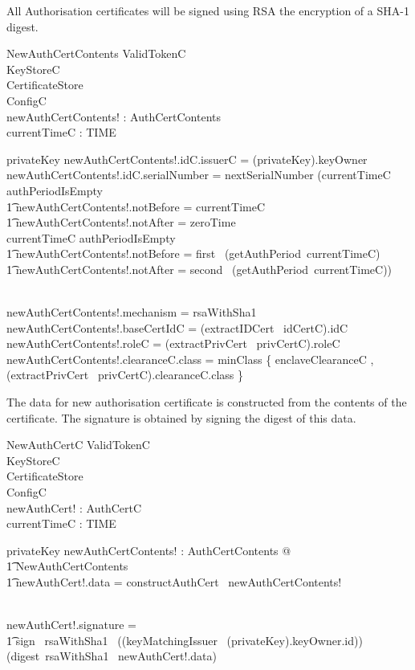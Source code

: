 All Authorisation certificates will be signed using RSA the encryption
of a SHA-1 digest.

\begin{schema}{NewAuthCertContents}
        ValidTokenC
\\      KeyStoreC
\\      CertificateStore
\\      ConfigC
\\      newAuthCertContents! : AuthCertContents
\\      currentTimeC : TIME
\where
        
        privateKey \neq \Nil
\also
        newAuthCertContents!.idC.issuerC = (\The privateKey).keyOwner
\\      newAuthCertContents!.idC.serialNumber = nextSerialNumber
\also
        (currentTimeC \in authPeriodIsEmpty
\\ \t1    \land newAuthCertContents!.notBefore = currentTimeC
\\ \t1    \land  newAuthCertContents!.notAfter = zeroTime 
\\   \lor
        currentTimeC \notin authPeriodIsEmpty
\\ \t1    \land newAuthCertContents!.notBefore = first~ (getAuthPeriod~currentTimeC)
\\ \t1    \land newAuthCertContents!.notAfter = second~ (getAuthPeriod~currentTimeC))

\\      newAuthCertContents!.mechanism = rsaWithSha1
\\      newAuthCertContents!.baseCertIdC = (extractIDCert~ idCertC).idC
\\      newAuthCertContents!.roleC = (extractPrivCert~ privCertC).roleC
\\      newAuthCertContents!.clearanceC.class = minClass \{ enclaveClearanceC ,
(extractPrivCert~ privCertC).clearanceC.class \}
\end{schema}

The data for new authorisation certificate is constructed from the
contents of the certificate. The signature is obtained by signing the
digest of this data.

\begin{schema}{NewAuthCertC}
        ValidTokenC
\\      KeyStoreC
\\      CertificateStore
\\      ConfigC
\\      newAuthCert! : AuthCertC
\\      currentTimeC : TIME
\where
        
        privateKey \neq \Nil
\also
        \exists newAuthCertContents! : AuthCertContents @ 
\\  \t1     NewAuthCertContents
\\  \t1   \land  newAuthCert!.data = constructAuthCert~ newAuthCertContents!

\\  newAuthCert!.signature = 
\\ \t1   sign~ rsaWithSha1~
        (\The (keyMatchingIssuer~ (\The privateKey).keyOwner.id))~
        (digest~rsaWithSha1~ newAuthCert!.data) 
\end{schema}

